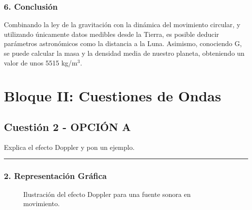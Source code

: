 \subsubsection*{6. Conclusión}
\begin{cajaconclusion}
Combinando la ley de la gravitación con la dinámica del movimiento circular, y utilizando únicamente datos medibles desde la Tierra, es posible deducir parámetros astronómicos como la distancia a la Luna. Asimismo, conociendo G, se puede calcular la masa y la densidad media de nuestro planeta, obteniendo un valor de unos 5515 kg/m$^3$.
\end{cajaconclusion}

\newpage

\section{Bloque II: Cuestiones de Ondas}
\label{sec:ondas_2009_jun_ord}

\subsection{Cuestión 2 - OPCIÓN A}
\label{subsec:2A_2009_jun_ord}

\begin{cajaenunciado}
Explica el efecto Doppler y pon un ejemplo.
\end{cajaenunciado}
\hrule

\subsubsection*{2. Representación Gráfica}
\begin{figure}[H]
    \centering
    \caption{Ilustración del efecto Doppler para una fuente sonora en movimiento.}
\end{figure}


